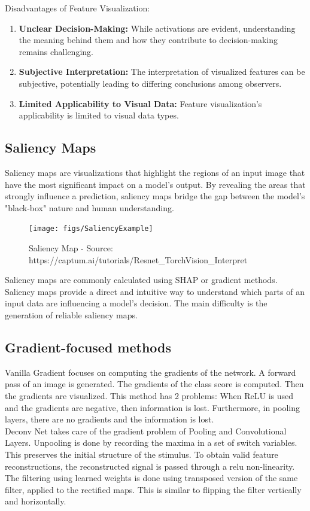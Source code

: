 Disadvantages of Feature Visualization:
\begin{enumerate}
	\item \textbf{Unclear Decision-Making:} While activations are evident, understanding the meaning behind them and how they contribute to decision-making remains challenging.
	\item \textbf{Subjective Interpretation:} The interpretation of visualized features can be subjective, potentially leading to differing conclusions among observers.
	\item \textbf{Limited Applicability to Visual Data:} Feature visualization's applicability is  limited to visual data types.
\end{enumerate}


\subsection{Saliency Maps}

Saliency maps are visualizations that highlight the regions of an input image that have the most significant impact on a model's output. By revealing the areas that strongly influence a prediction, saliency maps bridge the gap between the model's "black-box" nature and human understanding.

\begin{figure}[h!]
	\centering
	\texttt{[image: figs/SaliencyExample]}
	\caption{Saliency Map - Source: https://captum.ai/tutorials/Resnet\_TorchVision\_Interpret}
	\label{fig:saliency}
\end{figure}

Saliency maps are commonly calculated using SHAP \cite{lundberg2017unified} or gradient methods. Saliency maps provide a direct and intuitive way to understand which parts of an input data are influencing a model's decision. The main difficulty is the generation of reliable saliency maps.


\subsection{Gradient-focused methods}
\label{IG}


Vanilla Gradient focuses on computing the gradients of the network. A forward pass of an image is generated. The gradients of the class score is computed. Then the gradients are visualized.
This method has 2 problems: When ReLU is used and the gradients are negative, then information is lost. Furthermore, in pooling layers, there are no gradients and the information is lost. 
\\
Deconv Net \cite{Zeiler2011AdaptiveDN} takes care of the gradient problem of Pooling and Convolutional Layers. Unpooling is done by recording the maxima in a set of switch variables. This preserves the initial structure of the stimulus. 
To obtain valid feature reconstructions, the reconstructed signal is passed through a relu non-linearity.
The filtering using learned weights is done using transposed version of the same filter, applied to the rectified maps. This is similar to flipping the filter vertically and horizontally.

